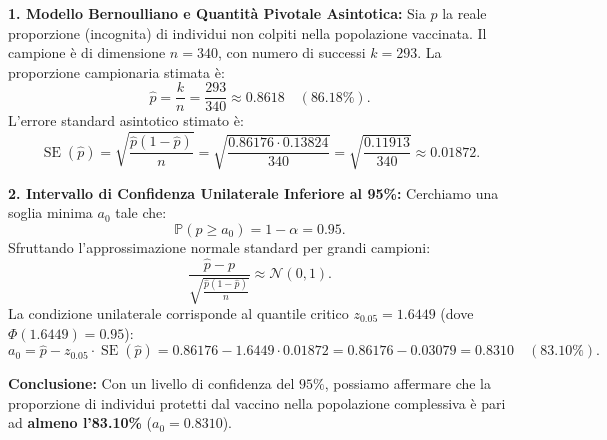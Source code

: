 \documentclass[11pt,a4paper]{article}
\newcommand{\Prob}{\mathbb{P}}
\begin{document}
\begin{soluzionebox}
\textbf{1. Modello Bernoulliano e Quantità Pivotale Asintotica:}
Sia $p$ la reale proporzione (incognita) di individui non colpiti nella popolazione vaccinata.
Il campione è di dimensione $n = 340$, con numero di successi $k = 293$.
La proporzione campionaria stimata è:
\[
\widehat{p} = \frac{k}{n} = \frac{293}{340} \approx \bm{0.8618} \quad (\bm{86.18\%}).
\]
L'errore standard asintotico stimato è:
\[
\operatorname{SE}(\widehat{p}) = \sqrt{\frac{\widehat{p}(1-\widehat{p})}{n}} = \sqrt{\frac{0.86176 \cdot 0.13824}{340}} = \sqrt{\frac{0.11913}{340}} \approx \bm{0.01872}.
\]

\textbf{2. Intervallo di Confidenza Unilaterale Inferiore al 95\%:}
Cerchiamo una soglia minima $a_0$ tale che:
\[
\Prob(p \ge a_0) = 1 - \alpha = 0.95.
\]
Sfruttando l'approssimazione normale standard per grandi campioni:
\[
\frac{\widehat{p} - p}{\sqrt{\frac{\widehat{p}(1-\widehat{p})}{n}}} \approx \mathcal{N}(0, 1).
\]
La condizione unilaterale corrisponde al quantile critico $z_{0.05} = 1.6449$ (dove $\Phi(1.6449) = 0.95$):
\[
a_0 = \widehat{p} - z_{0.05} \cdot \operatorname{SE}(\widehat{p}) = 0.86176 - 1.6449 \cdot 0.01872 = 0.86176 - 0.03079 = \bm{0.8310} \quad (\bm{83.10\%}).
\]

\textbf{Conclusione:}
Con un livello di confidenza del $95\%$, possiamo affermare che la proporzione di individui protetti dal vaccino nella popolazione complessiva è pari ad \textbf{almeno l'83.10\%} ($a_0 = \bm{0.8310}$).
\end{soluzionebox}
\end{document}
